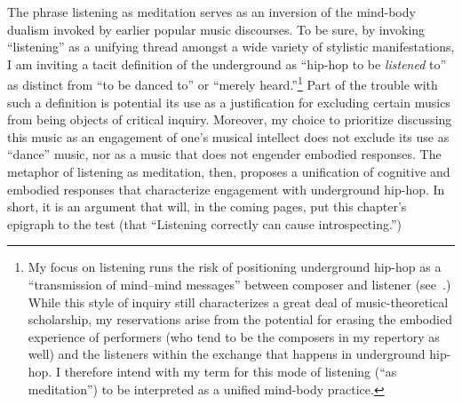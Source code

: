 The phrase listening as meditation serves as an inversion of the mind-body dualism invoked by 
earlier popular music discourses. To be sure, by invoking ``listening'' as a unifying thread 
amongst a wide variety of stylistic manifestations, I am inviting a tacit definition of the 
underground as ``hip-hop to be \emph{listened} to'' as distinct from ``to be danced to'' or 
``merely heard.''\footnote{
    My focus on listening runs the risk of positioning underground hip-hop as a ``transmission of mind--mind messages'' 
    between composer and listener (see~\autocite[20]{suzanneg.cusickFeministTheoryMusic1994}.) While this style of
    inquiry still characterizes a great deal of music-theoretical scholarship, my reservations arise from the potential
    for erasing the embodied experience of performers (who tend to be the composers in my repertory as well) and the
    listeners within the exchange that happens in underground hip-hop. I therefore intend with my term for this mode
    of listening (``as meditation'') to be interpreted as a unified mind-body practice.}
Part of the trouble with such a definition is potential its use as a justification  for excluding certain
musics from being objects of critical inquiry. Moreover, my choice to prioritize discussing 
this music as an engagement of one's musical intellect does not exclude its use as ``dance'' 
music, nor as a music that does not engender embodied responses. The metaphor of listening 
as meditation, then, proposes a unification of cognitive and embodied responses that characterize
engagement with underground hip-hop. In short, it is an argument that will, in the coming pages,
put this chapter's epigraph to the test (that ``Listening correctly can cause introspecting.'')

